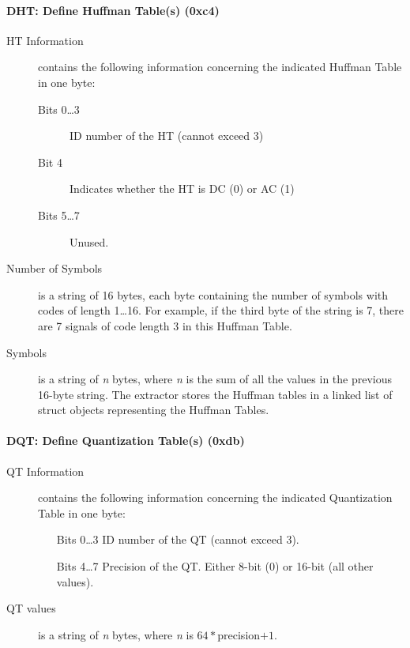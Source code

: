 \paragraph*{DHT: Define Huffman Table(s) (0xc4)}
\begin{description}
	\item[HT Information] contains the following information concerning the indicated Huffman Table in one byte:
		\begin{description}
			\item[Bits 0\ldots3] ID number of the HT (cannot exceed 3)
			\item[Bit 4] Indicates whether the HT is DC (0) or AC (1)
			\item[Bits 5\ldots7] Unused.
		\end{description}
	\item[Number of Symbols] is a string of 16 bytes, each byte containing the number of symbols with 
		codes of length 1\ldots16. For example, if the third byte of the string is 7, 
		there are 7 signals of code length 3 in this Huffman Table.
	\item[Symbols] is a string of \emph{n} bytes, where \emph{n} is 
		the sum of all the values in the previous 16-byte string. 
		The extractor stores the Huffman tables in a linked list of struct objects representing the Huffman Tables.
\end{description}

\paragraph*{DQT: Define Quantization Table(s) (0xdb)}
\begin{description}
	\item[QT Information] contains the following information concerning the indicated Quantization Table in one byte:
		\begin{itemize}
			\item[Bits 0\ldots3] ID number of the QT (cannot exceed 3).
			\item[Bits 4\ldots7] Precision of the QT. Either 8-bit (0) or 16-bit (all other values).
		\end{itemize}
	\item[QT values] is a string of \emph{n} bytes, where \emph{n} is $64*$precision$+1$.
\end{description}


